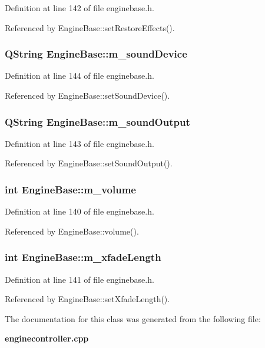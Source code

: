 Definition at line 142 of file enginebase.h.

Referenced by Engine\-Base::set\-Restore\-Effects().
\subsubsection{\setlength{\rightskip}{0pt plus 5cm}QString {\bf Engine\-Base::m\_\-sound\-Device}\hspace{0.3cm}{\tt  [protected, inherited]}}\label{classEngineBase_EngineBasep5}




Definition at line 144 of file enginebase.h.

Referenced by Engine\-Base::set\-Sound\-Device().
\subsubsection{\setlength{\rightskip}{0pt plus 5cm}QString {\bf Engine\-Base::m\_\-sound\-Output}\hspace{0.3cm}{\tt  [protected, inherited]}}\label{classEngineBase_EngineBasep4}




Definition at line 143 of file enginebase.h.

Referenced by Engine\-Base::set\-Sound\-Output().
\subsubsection{\setlength{\rightskip}{0pt plus 5cm}int {\bf Engine\-Base::m\_\-volume}\hspace{0.3cm}{\tt  [protected, inherited]}}\label{classEngineBase_EngineBasep1}




Definition at line 140 of file enginebase.h.

Referenced by Engine\-Base::volume().
\subsubsection{\setlength{\rightskip}{0pt plus 5cm}int {\bf Engine\-Base::m\_\-xfade\-Length}\hspace{0.3cm}{\tt  [protected, inherited]}}\label{classEngineBase_EngineBasep2}




Definition at line 141 of file enginebase.h.

Referenced by Engine\-Base::set\-Xfade\-Length().

The documentation for this class was generated from the following file:\begin{CompactItemize}
\item 
{\bf enginecontroller.cpp}\end{CompactItemize}
